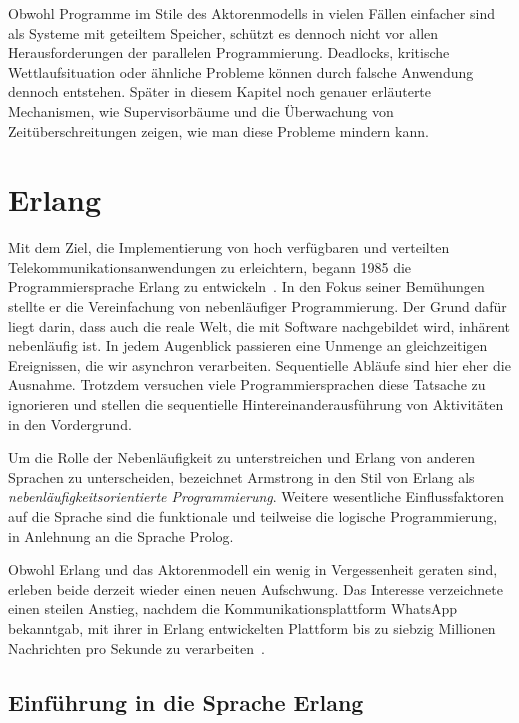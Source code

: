 Obwohl Programme im Stile des Aktorenmodells in vielen Fällen einfacher sind als Systeme mit geteiltem Speicher, schützt es dennoch nicht vor allen Herausforderungen der parallelen Programmierung. Deadlocks, kritische Wettlaufsituation oder ähnliche Probleme können durch falsche Anwendung dennoch entstehen. Später in diesem Kapitel noch genauer erläuterte Mechanismen, wie Supervisorbäume und die Überwachung von Zeitüberschreitungen zeigen, wie man diese Probleme mindern kann.

\section{Erlang}
\label{sec:erlang}

Mit dem Ziel, die Implementierung von hoch verfügbaren und verteilten Telekommunikationsanwendungen zu erleichtern, begann \citeauthor{Armstrong:1997:DE:258948.258967} 1985 die  Programmiersprache Erlang zu entwickeln~\cite{Armstrong:1997:DE:258948.258967}. In den Fokus seiner Bemühungen stellte er die Vereinfachung von nebenläufiger Programmierung. Der Grund dafür liegt darin, dass auch die reale Welt, die mit Software nachgebildet wird, inhärent nebenläufig ist. In jedem Augenblick passieren eine Unmenge an gleichzeitigen Ereignissen, die wir asynchron verarbeiten. Sequentielle Abläufe sind hier eher die Ausnahme. Trotzdem versuchen viele Programmiersprachen diese Tatsache zu ignorieren und stellen die sequentielle Hintereinanderausführung von Aktivitäten in den Vordergrund.

Um die Rolle der Nebenläufigkeit zu unterstreichen und Erlang von anderen Sprachen zu unterscheiden, bezeichnet Armstrong in \cite[19]{armstrong03} den Stil von Erlang als \textit{nebenläufigkeitsorientierte Programmierung}. Weitere wesentliche Einflussfaktoren auf die Sprache sind die funktionale und teilweise die logische Programmierung, in Anlehnung an die Sprache Prolog.

Obwohl Erlang und das Aktorenmodell ein wenig in Vergessenheit geraten sind, erleben beide derzeit wieder einen neuen Aufschwung. Das Interesse verzeichnete einen steilen Anstieg, nachdem die Kommunikationsplattform WhatsApp bekanntgab, mit ihrer in Erlang entwickelten Plattform bis zu siebzig Millionen Nachrichten pro Sekunde zu verarbeiten~\cite{ErlangWhatsApp}.

\subsection{Einführung in die Sprache Erlang}


